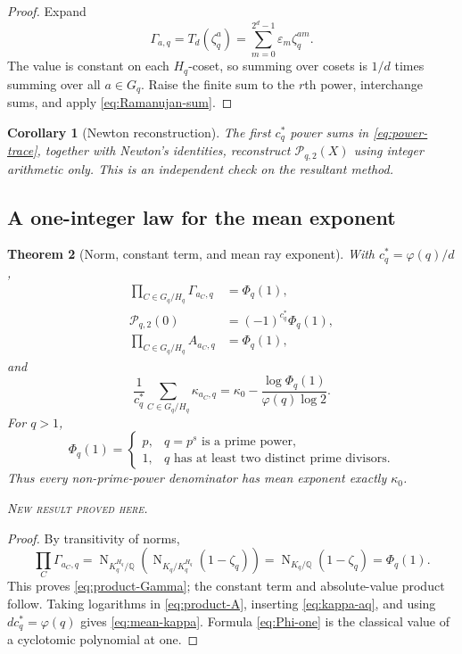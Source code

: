 \documentclass[11pt,oneside]{article}
\newtheorem{theorem}{Theorem}[section]
\newtheorem{corollary}[theorem]{Corollary}
\theoremstyle{definition}
\theoremstyle{remark}
\newcommand{\Q}{\mathbb Q}
\newcommand{\Norm}{\operatorname{N}}
\newcommand{\eps}{\varepsilon}
\newcommand{\newresult}{\textcolor{newgreen}{\textsc{New result proved here.}}}
\begin{document}
\begin{proof}
Expand
\[
 \Gamma_{a,q}=T_d(\zeta_q^a)=\sum_{m=0}^{2^d-1}\eps_m\zeta_q^{am}.
\]
The value is constant on each $H_q$-coset, so summing over cosets is $1/d$ times
summing over all $a\in G_q$. Raise the finite sum to the $r$th power, interchange
sums, and apply \eqref{eq:Ramanujan-sum}.
\end{proof}

\begin{corollary}[Newton reconstruction]\label{cor:Newton-reconstruction}
The first $c_q^*$ power sums in \eqref{eq:power-trace}, together with Newton's
identities, reconstruct $\mathscr P_{q,2}(X)$ using integer arithmetic only.
This is an independent check on the resultant method.
\end{corollary}

\subsection{A one-integer law for the mean exponent}

\begin{theorem}[Norm, constant term, and mean ray exponent]\label{thm:mean-exponent}
With $c_q^*=\varphi(q)/d$,
\begin{align}
 \prod_{C\in G_q/H_q}\Gamma_{a_C,q}&=\Phi_q(1),
 \label{eq:product-Gamma}\\
 \mathscr P_{q,2}(0)&=(-1)^{c_q^*}\Phi_q(1),
 \label{eq:P-constant}\\
 \prod_{C\in G_q/H_q}A_{a_C,q}&=\Phi_q(1),
 \label{eq:product-A}
\end{align}
and
\begin{equation}
 \boxed{
 \frac1{c_q^*}\sum_{C\in G_q/H_q}\kappa_{a_C,q}
 =\kappa_0-\frac{\log\Phi_q(1)}{\varphi(q)\log2}.}
 \label{eq:mean-kappa}
\end{equation}
For $q>1$,
\begin{equation}
 \Phi_q(1)=
 \begin{cases}
 p,&q=p^s\text{ is a prime power},\\
 1,&q\text{ has at least two distinct prime divisors}.
 \end{cases}
 \label{eq:Phi-one}
\end{equation}
Thus every non-prime-power denominator has mean exponent exactly $\kappa_0$.

\smallskip\noindent\newresult
\end{theorem}

\begin{proof}
By transitivity of norms,
\[
 \prod_C\Gamma_{a_C,q}
 =\Norm_{K_q^{H_q}/\Q}
 \!\left(\Norm_{K_q/K_q^{H_q}}(1-\zeta_q)\right)
 =\Norm_{K_q/\Q}(1-\zeta_q)=\Phi_q(1).
\]
This proves \eqref{eq:product-Gamma}; the constant term and absolute-value product
follow. Taking logarithms in \eqref{eq:product-A}, inserting \eqref{eq:kappa-aq},
and using $dc_q^*=\varphi(q)$ gives \eqref{eq:mean-kappa}. Formula
\eqref{eq:Phi-one} is the classical value of a cyclotomic polynomial at one.
\end{proof}
\end{document}
